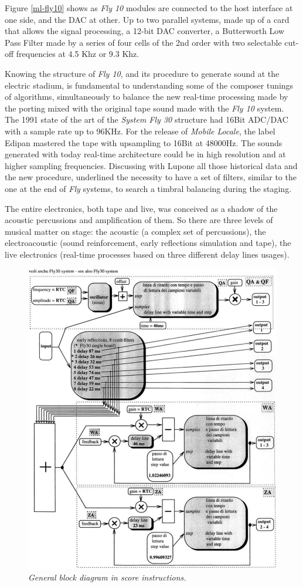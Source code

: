 \documentclass[twoside,a4paper]{article}
\begin{document}
Figure \ref{ml-fly10} shows as \emph{Fly 10} modules are connected to the host interface at one side, and the DAC at other. Up to two parallel systems, made up of a card that allows the signal processing, a 12-bit DAC converter, a Butterworth Low Pass Filter made by a series of four cells of the 2nd order with two selectable cut-off frequencies at 4.5 Khz or 9.3 Khz.

Knowing the structure of \emph{Fly 10}, and its procedure to generate sound at the electric stadium, is fundamental to understanding some of the composer tunings of algorithms,  simultaneously to balance the new real-time processing made by the porting mixed with the original tape sound made with the \emph{Fly 10} system. The 1991 state of the art of the \emph{System Fly 30} structure had 16Bit ADC/DAC with a sample rate up to 96KHz. For the release of \emph{Mobile Locale}, the label Edipan mastered the tape with upsampling to 16Bit at 48000Hz. The sounds generated with today real-time architecture could be in high resolution and at higher sampling frequencies. Discussing with Lupone all those historical data and the new procedure, underlined the necessity to have a set of filters, similar to the one at the end of \emph{Fly} systems, to search a timbral balancing during the staging. 

The entire electronics, both tape and live, was conceived as a shadow of the acoustic percussions and amplification of them. So there are three levels of musical matter on stage: the acoustic (a complex set of percussions), the electroacoustic (sound reinforcement, early reflections simulation and tape), the live electronics (real-time processes based on three different delay lines usages).

\begin{figure}[ht]
\centerline{\includegraphics[width=.45\textwidth]{img/1-comp}}
\caption{\label{ml-gen-dia}{\it General block diagram in score instructions.}}
\end{figure}
\end{document}
